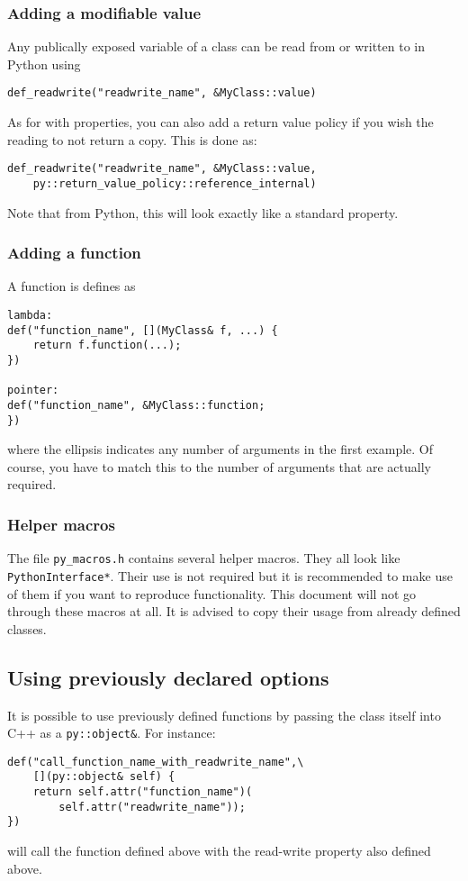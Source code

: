 \subsubsection{Adding a modifiable value}
Any publically exposed variable of a class can be read from or written to in Python using

\begin{verbatim}
def_readwrite("readwrite_name", &MyClass::value)
\end{verbatim}
As for with properties, you can also add a return value policy if you wish the reading
to not return a copy.  This is done as:
\begin{verbatim}
def_readwrite("readwrite_name", &MyClass::value,
    py::return_value_policy::reference_internal)
\end{verbatim}
Note that from Python, this will look exactly like a standard property.

\subsubsection{Adding a function}
A function is defines as
\begin{verbatim}
lambda:
def("function_name", [](MyClass& f, ...) {
    return f.function(...);
})

pointer:
def("function_name", &MyClass::function;
})
\end{verbatim}
where the ellipsis indicates any number of arguments in the first example.  Of course,
you have to match this to the number of arguments that are actually required.

\subsubsection{Helper macros}
The file \verb|py_macros.h| contains several helper macros.  They all look like \verb|PythonInterface*|.
Their use is not required but it is recommended to make use of them if you want to reproduce functionality.  This document will not go
through these macros at all.  It is advised to copy their usage from already defined classes.

\subsection{Using previously declared options}
It is possible to use previously defined functions by passing the class itself into C++ as a \verb|py::object&|.
For instance:
\begin{verbatim}
def("call_function_name_with_readwrite_name",\
    [](py::object& self) {
    return self.attr("function_name")(
        self.attr("readwrite_name"));
})
\end{verbatim}
will call the function defined above with the read-write property also defined above.

